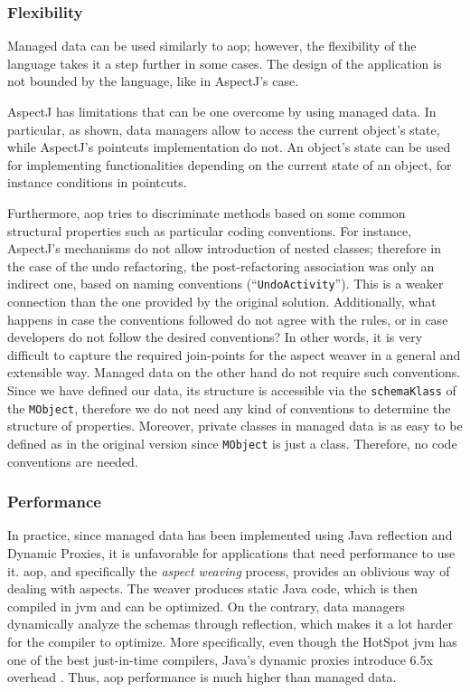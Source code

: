 \subsubsection{Flexibility}
Managed data can be used similarly to \ac{aop}; however, the flexibility of the language takes it a step further in some cases.
The design of the application is not bounded by the language, like in AspectJ's case.

AspectJ has limitations that can be one overcome by using managed data.
In particular, as shown, data managers allow to access the current object's state, while AspectJ's pointcuts implementation do not.
An object's state can be used for implementing functionalities depending on the current state of an object, for instance conditions in pointcuts.

Furthermore, \ac{aop} tries to discriminate methods based on some common structural properties such as particular coding conventions.
For instance, AspectJ's mechanisms do not allow introduction of nested classes; therefore in the case of the undo refactoring, the post-refactoring association was only an indirect one, based on naming conventions (``\texttt{UndoActivity}'').
This is a weaker connection than the one provided by the original solution.  
Additionally, what happens in case the conventions followed do not agree with the rules, or in case developers do not follow the desired conventions?
In other words, it is very difficult to capture the required join-points for the aspect weaver in a general and extensible way.
Managed data on the other hand do not require such conventions.
Since we have defined our data, its structure is accessible via the \texttt{schemaKlass} of the \texttt{MObject}, therefore we do not need any kind of conventions to determine the structure of properties.
Moreover, private classes in managed data is as easy to be defined as in the original version since \texttt{MObject} is just a class.
Therefore, no code conventions are needed.

\subsubsection{Performance}
In practice, since managed data has been implemented using Java reflection and Dynamic Proxies, it is unfavorable for applications that need performance to use it.
\ac{aop}, and specifically the \textit{aspect weaving} process, provides an oblivious way of dealing with aspects.
The weaver produces static Java code, which is then compiled in \ac{jvm} and can be optimized.
On the contrary, data managers dynamically analyze the schemas through reflection, which makes it a lot harder for the compiler to optimize. 
More specifically, even though the HotSpot \ac{jvm} has one of the best just-in-time compilers, Java's dynamic proxies introduce 6.5x overhead \cite{marr2015zero}.
Thus, \ac{aop} performance is much higher than managed data.

